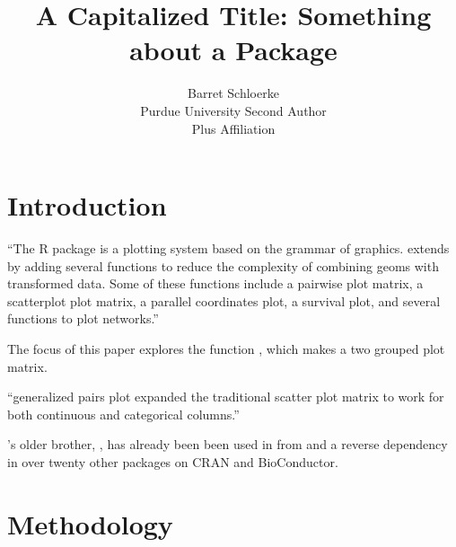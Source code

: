 \documentclass[article]{jss}
\author{Barret Schloerke\\Purdue University \And
        Second Author\\Plus Affiliation}
\title{A Capitalized Title: Something about a Package \pkg{GGally}}
\begin{document}




\section{Introduction}

  ``The R package  is a plotting system based on the grammar of graphics.  extends  by adding several functions to reduce the complexity of combining geoms with transformed data.
  Some of these functions include a pairwise plot matrix, a scatterplot plot matrix, a parallel coordinates plot, a survival plot, and several functions to plot networks.''

The focus of this paper explores the function , which makes a two grouped plot matrix.

  ``generalized pairs plot
    expanded the traditional scatter plot matrix to work for both continuous and categorical columns.''

  's older brother, , has already been been used in
    \cite{cook2016data}
     from \cite{xavier2016ggmcmc}
    and a reverse dependency in over twenty other packages on CRAN and BioConductor.




\section[Methodology]{Methodology}
\end{document}
